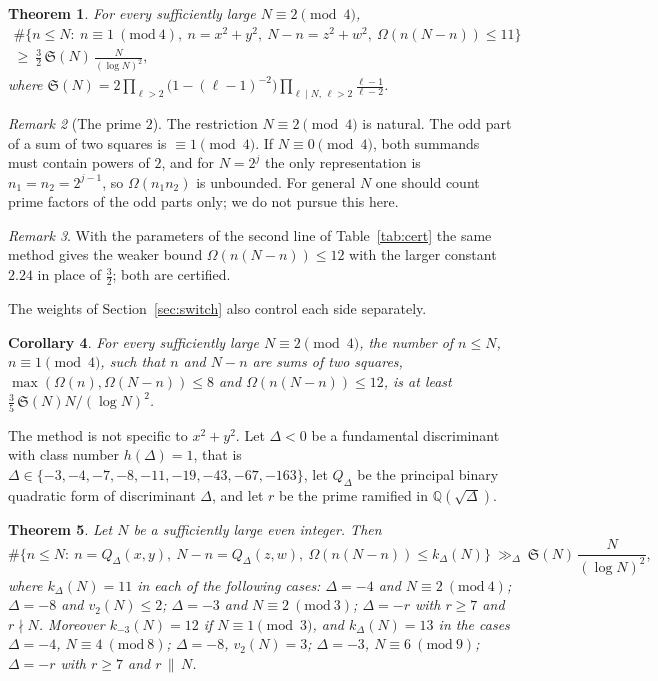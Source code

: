 \documentclass[11pt]{amsart}
\newtheorem{theorem}{Theorem}[section]
\newtheorem{corollary}[theorem]{Corollary}
\theoremstyle{remark}
\newtheorem{remark}[theorem]{Remark}
\newcommand{\Sg}{\mathfrak{S}}
\begin{document}
\begin{theorem}\label{thm:main}
For every sufficiently large $N\equiv 2\pmod 4$,
\begin{multline*}
\#\{n\le N:\ n\equiv 1\ (\mathrm{mod}\ 4),\ n=x^2+y^2,\ N-n=z^2+w^2,\ \Omega(n(N-n))\le 11\}\\
\ge\ \frac32\,\Sg(N)\,\frac{N}{(\log N)^2},
\end{multline*}
where $\Sg(N)=2\prod_{\ell>2}\bigl(1-(\ell-1)^{-2}\bigr)\prod_{\ell\mid N,\,\ell>2}\frac{\ell-1}{\ell-2}$.
\end{theorem}

\begin{remark}[The prime $2$]
The restriction $N\equiv2\pmod4$ is natural. The odd part of a sum of two squares is $\equiv1\pmod 4$.
If $N\equiv0\pmod 4$, both summands must contain powers of $2$, and for $N=2^j$ the only representation is
$n_1=n_2=2^{j-1}$, so $\Omega(n_1n_2)$ is unbounded. For general $N$ one should count prime factors of the
odd parts only; we do not pursue this here.
\end{remark}

\begin{remark}
With the parameters of the second line of Table~\ref{tab:cert} the same method gives the weaker bound
$\Omega(n(N-n))\le 12$ with the larger constant $2.24$ in place of $\frac32$; both are certified.
\end{remark}

The weights of Section~\ref{sec:switch} also control each side separately.

\begin{corollary}\label{cor:side}
For every sufficiently large $N\equiv2\pmod4$, the number of $n\le N$, $n\equiv1\pmod 4$, such that $n$ and
$N-n$ are sums of two squares, $\max(\Omega(n),\Omega(N-n))\le 8$ and $\Omega(n(N-n))\le12$, is at least
$\frac35\,\Sg(N)N/(\log N)^2$.
\end{corollary}

The method is not specific to $x^2+y^2$. Let $\Delta<0$ be a fundamental discriminant with class number
$h(\Delta)=1$, that is $\Delta\in\{-3,-4,-7,-8,-11,-19,-43,-67,-163\}$, let $Q_\Delta$ be the principal
binary quadratic form of discriminant $\Delta$, and let $r$ be the prime ramified in $\mathbb Q(\sqrt\Delta)$.

\begin{theorem}\label{thm:general}
Let $N$ be a sufficiently large even integer. Then
\[
\#\{n\le N:\ n=Q_\Delta(x,y),\ N-n=Q_\Delta(z,w),\ \Omega(n(N-n))\le k_\Delta(N)\}
\ \gg_\Delta\ \Sg(N)\,\frac{N}{(\log N)^2},
\]
where $k_\Delta(N)=11$ in each of the following cases:
$\Delta=-4$ and $N\equiv2\ (\mathrm{mod}\ 4)$;
$\Delta=-8$ and $v_2(N)\le2$;
$\Delta=-3$ and $N\equiv2\ (\mathrm{mod}\ 3)$;
$\Delta=-r$ with $r\ge7$ and $r\nmid N$.
Moreover $k_{-3}(N)=12$ if $N\equiv1\pmod 3$, and $k_\Delta(N)=13$ in the cases
$\Delta=-4$, $N\equiv4\ (\mathrm{mod}\ 8)$;
$\Delta=-8$, $v_2(N)=3$;
$\Delta=-3$, $N\equiv6\ (\mathrm{mod}\ 9)$;
$\Delta=-r$ with $r\ge7$ and $r\,\|\,N$.
\end{theorem}
\end{document}
